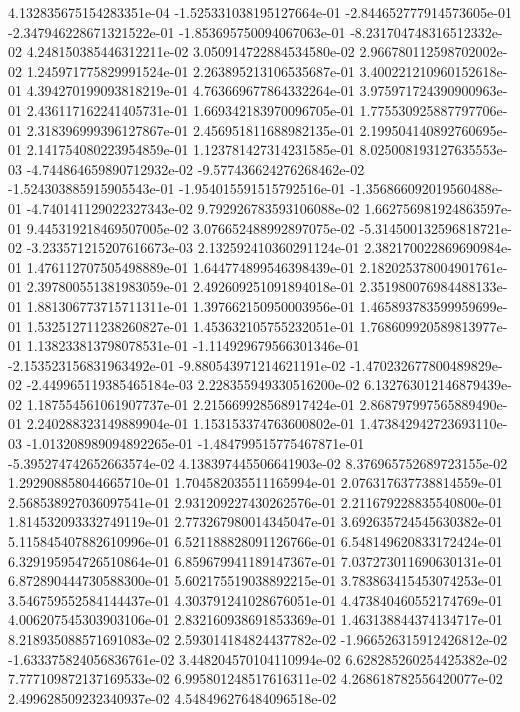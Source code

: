 4.132835675154283351e-04
-1.525331038195127664e-01
-2.844652777914573605e-01
-2.347946228671321522e-01
-1.853695750094067063e-01
-8.231704748316512332e-02
4.248150385446312211e-02
3.050914722884534580e-02
2.966780112598702002e-02
1.245971775829991524e-01
2.263895213106535687e-01
3.400221210960152618e-01
4.394270199093818219e-01
4.763669677864332264e-01
3.975971724390900963e-01
2.436117162241405731e-01
1.669342183970096705e-01
1.775530925887797706e-01
2.318396999396127867e-01
2.456951811688982135e-01
2.199504140892760695e-01
2.141754080223954859e-01
1.123781427314231585e-01
8.025008193127635553e-03
-4.744864659890712932e-02
-9.577436624276268462e-02
-1.524303885915905543e-01
-1.954015591515792516e-01
-1.356866092019560488e-01
-4.740141129022327343e-02
9.792926783593106088e-02
1.662756981924863597e-01
9.445319218469507005e-02
3.076652488992897075e-02
-5.314500132596818721e-02
-3.233571215207616673e-03
2.132592410360291124e-01
2.382170022869690984e-01
1.476112707505498889e-01
1.644774899546398439e-01
2.182025378004901761e-01
2.397800551381983059e-01
2.492609251091894018e-01
2.351980076984488133e-01
1.881306773715711311e-01
1.397662150950003956e-01
1.465893783599959699e-01
1.532512711238260827e-01
1.453632105755232051e-01
1.768609920589813977e-01
1.138233813798078531e-01
-1.114929679566301346e-01
-2.153523156831963492e-01
-9.880543971214621191e-02
-1.470232677800489829e-02
-2.449965119385465184e-03
2.228355949330516200e-02
6.132763012146879439e-02
1.187554561061907737e-01
2.215669928568917424e-01
2.868797997565889490e-01
2.240288323149889904e-01
1.153153374763600802e-01
1.473842942723693110e-03
-1.013208989094892265e-01
-1.484799515775467871e-01
-5.395274742652663574e-02
4.138397445506641903e-02
8.376965752689723155e-02
1.292908858044665710e-01
1.704582035511165994e-01
2.076317637738814559e-01
2.568538927036097541e-01
2.931209227430262576e-01
2.211679228835540800e-01
1.814532093332749119e-01
2.773267980014345047e-01
3.692635724545630382e-01
5.115845407882610996e-01
6.521188828091126766e-01
6.548149620833172424e-01
6.329195954726510864e-01
6.859679941189147367e-01
7.037273011690630131e-01
6.872890444730588300e-01
5.602175519038892215e-01
3.783863415453074253e-01
3.546759552584144437e-01
4.303791241028676051e-01
4.473840460552174769e-01
4.006207545303903106e-01
2.832160938691853369e-01
1.463138844374134717e-01
8.218935088571691083e-02
2.593014184824437782e-02
-1.966526315912426812e-02
-1.633375824056836761e-02
3.448204570104110994e-02
6.628285260254425382e-02
7.777109872137169533e-02
6.995801248517616311e-02
4.268618782556420077e-02
2.499628509232340937e-02
4.548496276484096518e-02
